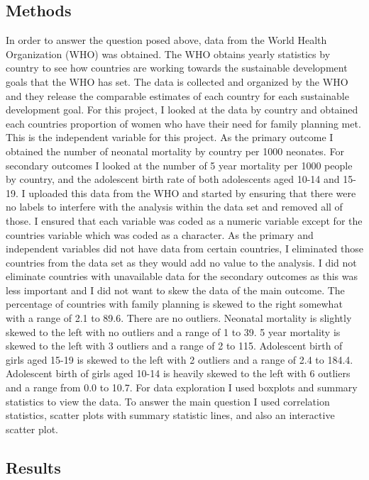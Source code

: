 \documentclass[
  letterpaper,
  DIV=11,
  numbers=noendperiod]{scrartcl}
\begin{document}
\hypertarget{methods}{%
\subsection{\texorpdfstring{\textbf{Methods}}{Methods}}\label{methods}}

In order to answer the question posed above, data from the World Health
Organization (WHO) was obtained. The WHO obtains yearly statistics by
country to see how countries are working towards the sustainable
development goals that the WHO has set. The data is collected and
organized by the WHO and they release the comparable estimates of each
country for each sustainable development goal. For this project, I
looked at the data by country and obtained each countries proportion of
women who have their need for family planning met. This is the
independent variable for this project. As the primary outcome I obtained
the number of neonatal mortality by country per 1000 neonates. For
secondary outcomes I looked at the number of 5 year mortality per 1000
people by country, and the adolescent birth rate of both adolescents
aged 10-14 and 15-19. I uploaded this data from the WHO and started by
ensuring that there were no labels to interfere with the analysis within
the data set and removed all of those. I ensured that each variable was
coded as a numeric variable except for the countries variable which was
coded as a character. As the primary and independent variables did not
have data from certain countries, I eliminated those countries from the
data set as they would add no value to the analysis. I did not eliminate
countries with unavailable data for the secondary outcomes as this was
less important and I did not want to skew the data of the main outcome.
The percentage of countries with family planning is skewed to the right
somewhat with a range of 2.1 to 89.6. There are no outliers. Neonatal
mortality is slightly skewed to the left with no outliers and a range of
1 to 39. 5 year mortality is skewed to the left with 3 outliers and a
range of 2 to 115. Adolescent birth of girls aged 15-19 is skewed to the
left with 2 outliers and a range of 2.4 to 184.4. Adolescent birth of
girls aged 10-14 is heavily skewed to the left with 6 outliers and a
range from 0.0 to 10.7. For data exploration I used boxplots and summary
statistics to view the data. To answer the main question I used
correlation statistics, scatter plots with summary statistic lines, and
also an interactive scatter plot.

\hypertarget{results}{%
\subsection{\texorpdfstring{\textbf{Results}}{Results}}\label{results}}
\end{document}
